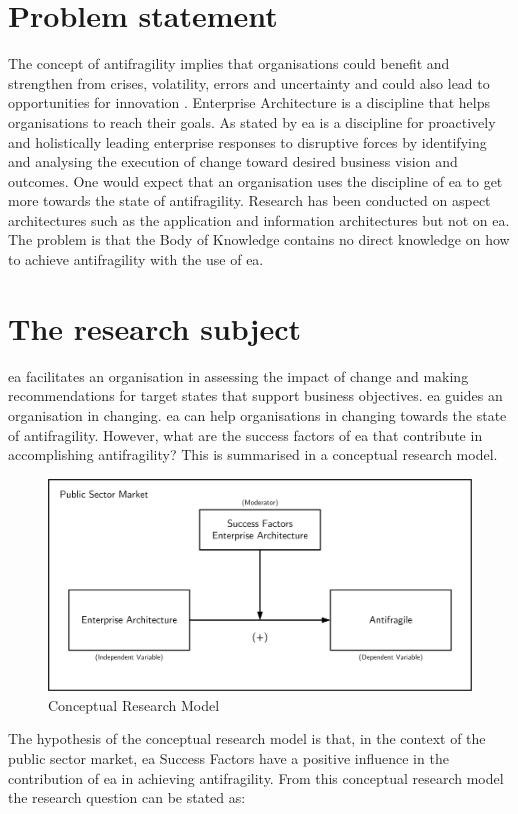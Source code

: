 \section{Problem statement}
\label{sec:problemstatement}
The concept of \gls{antifragility} implies that organisations could benefit and strengthen from crises, volatility, errors and uncertainty and could also lead to opportunities for innovation \parencite{Kastner2017}. Enterprise Architecture is a discipline that helps organisations to reach their goals. As stated by \textcite{Gartner} \acrshort{ea} is a discipline for proactively and holistically leading enterprise responses to disruptive forces by identifying and analysing the execution of change toward desired business vision and outcomes. One would expect that an organisation uses the discipline of \acrshort{ea} to get more towards the state of \gls{antifragility}. Research has been conducted on aspect architectures such as the application and information architectures but not on \acrshort{ea}. The problem is that the Body of Knowledge contains no direct knowledge on how to achieve \gls{antifragility} with the use of \acrshort{ea}. 

\section{The research subject}
\label{sec:research}
\acrshort{ea} facilitates an organisation in assessing the impact of change and making recommendations for target states that support business objectives. \acrshort{ea} guides an organisation in changing. \acrshort{ea} can help organisations in changing towards the state of \gls{antifragility}. However, what are the success factors of \acrshort{ea} that contribute in accomplishing \gls{antifragility}? This is summarised in a conceptual research model.
\begin{figure}[H]
	\centering
	\includegraphics[width=0.8\linewidth]{images/conceptualmodel}
	\caption[Conceptual Research Model]{Conceptual Research Model}
	\label{fig:conceptualmodel}
\end{figure}
The hypothesis of the conceptual research model is that, in the context of the public sector market, \acrlong{ea} Success Factors have a positive influence in the contribution of \acrlong{ea} in achieving antifragility. From this conceptual research model the research question can be stated as:\bigskip

